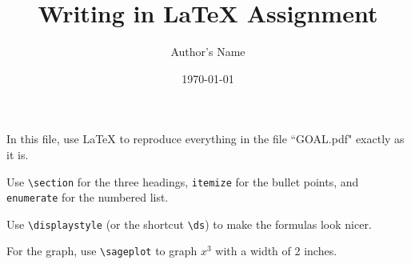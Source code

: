 \documentclass[12pt]{article}
\title{Writing in \LaTeX{} Assignment}
\author{Author's Name} %
\date{\today}
\begin{document}
\maketitle
\newcommand{\ds}{\displaystyle}

In this file, use \LaTeX{} to reproduce everything in the file ``GOAL.pdf" exactly as it is.

Use \verb|\section| for the three headings, \verb|itemize| for the bullet points, and \verb|enumerate| for the numbered list.

Use \verb|\displaystyle| (or the shortcut \verb|\ds|) to make the formulas look nicer.

For the graph, use \verb|\sageplot| to graph $x^3$ with a width of 2 inches.

\hrulefill

\end{document}
